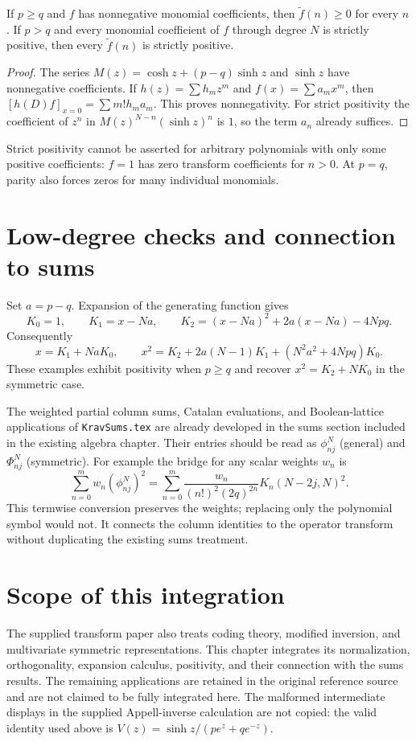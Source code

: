 \begin{proposition}
If $p\ge q$ and $f$ has nonnegative monomial coefficients, then
$\widetilde f(n)\ge0$ for every $n$. If $p>q$ and every monomial
coefficient of $f$ through degree $N$ is strictly positive, then every
$\widetilde f(n)$ is strictly positive.
\end{proposition}
\begin{proof}
The series $M(z)=\cosh z+(p-q)\sinh z$ and $\sinh z$ have nonnegative
coefficients. If $h(z)=\sum h_mz^m$ and $f(x)=\sum a_mx^m$, then
$[h(D)f]_{x=0}=\sum m!h_ma_m$. This proves nonnegativity.
For strict positivity the coefficient of $z^n$ in
$M(z)^{N-n}(\sinh z)^n$ is $1$, so the term $a_n$ already suffices.
\end{proof}
Strict positivity cannot be asserted for arbitrary polynomials with only
some positive coefficients: $f=1$ has zero transform coefficients for $n>0$.
At $p=q$, parity also forces zeros for many individual monomials.

\section{Low-degree checks and connection to sums}
Set $a=p-q$. Expansion of the generating function gives
\begin{equation*}
K_0=1,\qquad K_1=x-Na,\qquad
K_2=(x-Na)^2+2a(x-Na)-4Npq.
\end{equation*}
Consequently
\begin{equation*}
x=K_1+NaK_0,
\qquad
x^2=K_2+2a(N-1)K_1+(N^2a^2+4Npq)K_0.
\end{equation*}
These examples exhibit positivity when $p\ge q$ and recover
$x^2=K_2+NK_0$ in the symmetric case.

The weighted partial column sums, Catalan evaluations, and Boolean-lattice
applications of \texttt{KravSums.tex} are already developed in the sums
section included in the existing algebra chapter. Their entries should
be read as $\phi^N_{nj}$ (general) and $\Phi^N_{nj}$ (symmetric).
For example the bridge for any scalar weights $w_n$ is
\begin{equation*}
\sum_{n=0}^m w_n(\phi^N_{nj})^2
=\sum_{n=0}^m\frac{w_n}{(n!)^2(2q)^{2n}}
K_n(N-2j,N)^2.
\end{equation*}
This termwise conversion preserves the weights; replacing only the
polynomial symbol would not. It connects the column identities to the
operator transform without duplicating the existing sums treatment.



\section{Scope of this integration}
The supplied transform paper also treats coding theory, modified inversion,
and multivariate symmetric representations. This chapter integrates its
normalization, orthogonality, expansion calculus, positivity, and their
connection with the sums results. The remaining applications are retained
in the original reference source and are not claimed to be fully integrated
here. The malformed intermediate displays in the supplied Appell-inverse
calculation are not copied: the valid identity used above is
$V(z)=\sinh z/(pe^z+qe^{-z})$.
